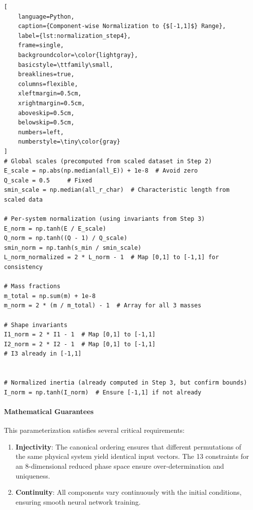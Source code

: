 \begin{enumerate}
\begin{lstlisting}[
    language=Python,
    caption={Component-wise Normalization to {$[-1,1]$} Range},
    label={lst:normalization_step4},
    frame=single,
    backgroundcolor=\color{lightgray},
    basicstyle=\ttfamily\small,
    breaklines=true,
    columns=flexible,
    xleftmargin=0.5cm,
    xrightmargin=0.5cm,
    aboveskip=0.5cm,
    belowskip=0.5cm,
    numbers=left,
    numberstyle=\tiny\color{gray}
]
# Global scales (precomputed from scaled dataset in Step 2)
E_scale = np.abs(np.median(all_E)) + 1e-8  # Avoid zero
Q_scale = 0.5     # Fixed
smin_scale = np.median(all_r_char)  # Characteristic length from scaled data

# Per-system normalization (using invariants from Step 3)
E_norm = np.tanh(E / E_scale)
Q_norm = np.tanh((Q - 1) / Q_scale)
smin_norm = np.tanh(s_min / smin_scale)
L_norm_normalized = 2 * L_norm - 1  # Map [0,1] to [-1,1] for consistency

# Mass fractions
m_total = np.sum(m) + 1e-8
m_norm = 2 * (m / m_total) - 1  # Array for all 3 masses

# Shape invariants
I1_norm = 2 * I1 - 1  # Map [0,1] to [-1,1]
I2_norm = 2 * I2 - 1  # Map [0,1] to [-1,1]
# I3 already in [-1,1]


# Normalized inertia (already computed in Step 3, but confirm bounds)
I_norm = np.tanh(I_norm)  # Ensure [-1,1] if not already
\end{lstlisting}


    \paragraph{Mathematical Guarantees} This parameterization satisfies several critical requirements:

    \begin{enumerate}
    \item \textbf{Injectivity}: The canonical ordering ensures that different permutations of the same physical system yield identical input vectors. The 13 constraints for an 8-dimensional reduced phase space ensure over-determination and uniqueness.

    \item \textbf{Continuity}: All components vary continuously with the initial conditions, ensuring smooth neural network training.


\end{enumerate}
\end{enumerate}
